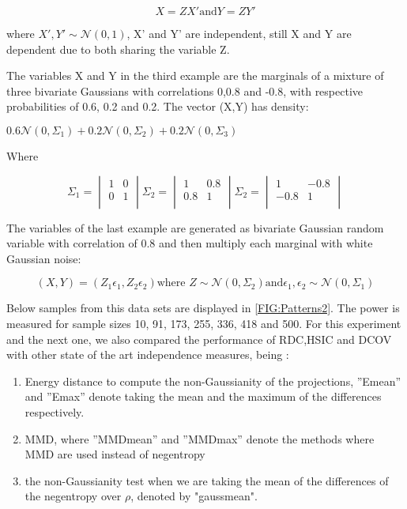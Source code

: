 $$X=ZX' \text{and} Y = ZY'$$

where $X',Y' \sim \mathcal{N}(0,1)$, X' and Y' are independent, still X and Y are dependent due to both sharing the variable Z.

The variables X and Y in the third example are the marginals of a mixture of three bivariate Gaussians with correlations 0,0.8 and -0.8, with respective probabilities of 0.6, 0.2 and 0.2. 
The vector (X,Y) has density:

$0.6\mathcal{N}(0,\Sigma_{1}) + 0.2\mathcal{N}(0,\Sigma_{2}) + 0.2\mathcal{N}(0,\Sigma_{3})$

Where 

$$\Sigma_{1} =\begin{vmatrix}1&0\\0&1\\ \end{vmatrix} \Sigma_{2} =\begin{vmatrix}1&0.8\\0.8&1\\ \end{vmatrix} \Sigma_{2} =\begin{vmatrix}1&-0.8\\-0.8&1\\ \end{vmatrix}$$

The variables of the last example are generated as bivariate Gaussian random variable with correlation of 0.8 and then multiply each marginal with white Gaussian noise:

$$(X,Y) = (Z_{1}\epsilon_{1},Z_{2}\epsilon_{2}) \text{where } Z\sim\mathcal{N}(0,\Sigma_{2}) \text{and} \epsilon_{1},\epsilon_{2}\sim\mathcal{N}(0,\Sigma_{1})$$

Below samples from this data sets are displayed in \ref{FIG:Patterns2}. The power is measured for sample sizes 10,  91, 173, 255, 336, 418 and 500. For this experiment and the next one, we also compared the performance of RDC,HSIC and DCOV with other state of the art independence measures, being : 

\begin{enumerate}
\item Energy distance to compute the non-Gaussianity of the projections, ”Emean” and ”Emax” denote taking the mean and the maximum of the differences respectively.
\item MMD, where ”MMDmean” and ”MMDmax” denote the methods where
MMD are used instead of negentropy
\item the non-Gaussianity test when we are taking the mean of the differences of the negentropy over $\rho$, denoted by "gaussmean".
\end{enumerate}

